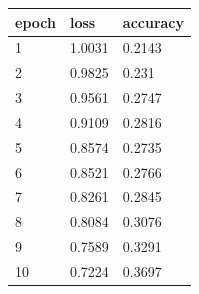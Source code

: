 \begin{tabular}{lll}
\hline
epoch & loss & accuracy \\
\hline
1 & 1.0031 & 0.2143 \\
2 & 0.9825 & 0.231 \\
3 & 0.9561 & 0.2747 \\
4 & 0.9109 & 0.2816 \\
5 & 0.8574 & 0.2735 \\
6 & 0.8521 & 0.2766 \\
7 & 0.8261 & 0.2845 \\
8 & 0.8084 & 0.3076 \\
9 & 0.7589 & 0.3291 \\
10 & 0.7224 & 0.3697 \\
\hline
\end{tabular}
